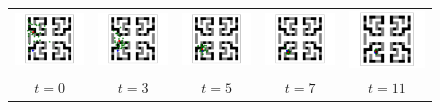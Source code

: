 \documentclass[letterpaper]{article} %
\begin{document}
\begin{figure}[t]
	\centering
	\begin{tabular}{ccccc}
		\includegraphics[width=0.18\linewidth]{figs/117/0.pdf} &
		\includegraphics[width=0.18\linewidth]{figs/117/3.pdf} &
		\includegraphics[width=0.18\linewidth]{figs/117/5.pdf} &
		\includegraphics[width=0.18\linewidth]{figs/117/7.pdf} &
		\includegraphics[width=0.18\linewidth]{figs/117/11.pdf} \\
		$t=0$ & $t=3$ & $t=5$ & $t=7$ & $t=11$
	\end{tabular}
\end{figure}
\end{document}
